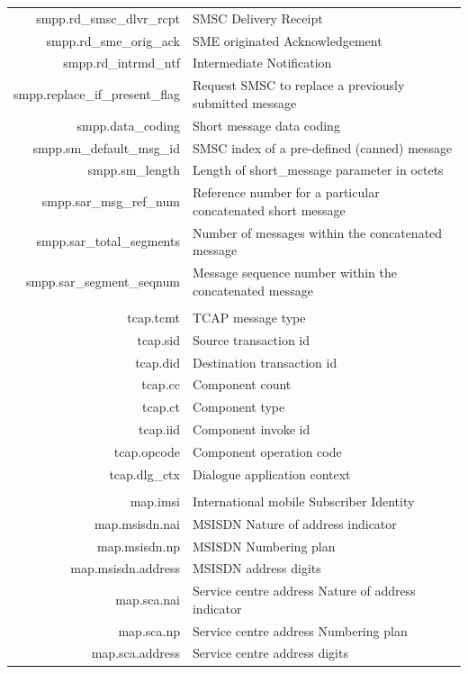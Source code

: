 \documentclass[a4paper,latin]{paper}
\begin{document}
\begin{tabularx}{\linewidth}{ | >{\ttfamily} r | >{\ttfamily} X |}
	smpp.rd\_smsc\_dlvr\_rcpt		& SMSC Delivery Receipt\\
	smpp.rd\_sme\_orig\_ack			& SME originated Acknowledgement\\
	smpp.rd\_intrmd\_ntf			& Intermediate Notification\\
	smpp.replace\_if\_present\_flag		& Request SMSC to replace a previously submitted message\\
	smpp.data\_coding			& Short message data coding\\
	smpp.sm\_default\_msg\_id		& SMSC index of a pre-defined (canned) message\\
	smpp.sm\_length				& Length of short\_message parameter in octets\\
	smpp.sar\_msg\_ref\_num			& Reference number for a particular concatenated short message\\
	smpp.sar\_total\_segments		& Number of messages within the concatenated message\\
	smpp.sar\_segment\_seqnum		& Message sequence number within the concatenated message\\
	\hline
	\rowcolor{blue!10}
	\multicolumn{2}{| l |}{\acrfull{tcap}} 	\\
	\hline
	tcap.tcmt				& TCAP message type\\
	tcap.sid				& Source transaction id\\
	tcap.did				& Destination transaction id\\
	tcap.cc					& Component count\\
	tcap.ct					& Component type\\
	tcap.iid				& Component invoke id\\
	tcap.opcode				& Component operation code\\
	tcap.dlg\_ctx				& Dialogue application context\\
	\hline
	\rowcolor{blue!10}
	\multicolumn{2}{| l |}{\acrfull{map}} 	\\
	\hline
	map.imsi				& International mobile Subscriber Identity\\
	map.msisdn.nai				& MSISDN Nature of address indicator\\
	map.msisdn.np				& MSISDN Numbering plan\\
	map.msisdn.address			& MSISDN address digits\\
	map.sca.nai				& Service centre address Nature of address indicator\\
	map.sca.np				& Service centre address Numbering plan \\
	map.sca.address				& Service centre address digits\\

\end{tabularx}
\end{document}
